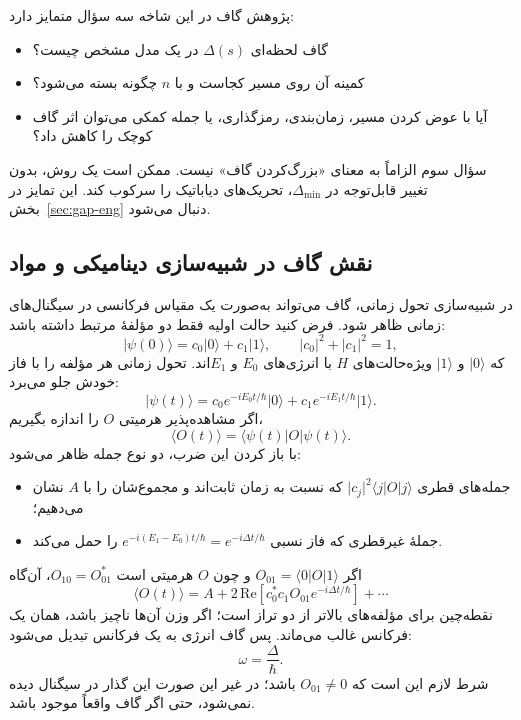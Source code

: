 پژوهش گاف در این شاخه سه سؤال متمایز دارد:
\begin{itemize}
	\item گاف لحظه‌ای $\Delta(s)$ در یک مدل مشخص چیست؟
	\item کمینه آن روی مسیر کجاست و با $n$ چگونه بسته می‌شود؟
	\item آیا با عوض کردن مسیر، زمان‌بندی، رمزگذاری، یا جمله کمکی می‌توان اثر گاف کوچک را کاهش داد؟
\end{itemize}

سؤال سوم الزاماً به معنای «بزرگ‌کردن گاف» نیست.
ممکن است یک روش، بدون تغییر قابل‌توجه در $\Delta_{\min}$، تحریک‌های دیاباتیک را سرکوب کند.
این تمایز در بخش~\ref{sec:gap-eng} دنبال می‌شود.

\subsection{نقش گاف در شبیه‌سازی دینامیکی و مواد}

در شبیه‌سازی تحول زمانی، گاف می‌تواند به‌صورت یک مقیاس فرکانسی در سیگنال‌های زمانی ظاهر شود.
فرض کنید حالت اولیه فقط دو مؤلفهٔ مرتبط داشته باشد:
\begin{equation}
	\lvert\psi(0)\rangle
	=
	c_0\lvert0\rangle+c_1\lvert1\rangle,
	\qquad
	\lvert c_0\rvert^{2}+\lvert c_1\rvert^{2}=1,
\end{equation}
که $\lvert0\rangle$ و $\lvert1\rangle$ ویژه‌حالت‌های $H$ با انرژی‌های $E_0$ و $E_1$اند.
تحول زمانی هر مؤلفه را با فاز خودش جلو می‌برد:
\begin{equation}
	\lvert\psi(t)\rangle
	=
	c_0 e^{-iE_0 t/\hbar}\lvert0\rangle
	+
	c_1 e^{-iE_1 t/\hbar}\lvert1\rangle.
\end{equation}
اگر مشاهده‌پذیر هرمیتی $O$ را اندازه بگیریم،
\begin{equation}
	\langle O(t)\rangle
	=
	\langle\psi(t)\rvert O\lvert\psi(t)\rangle.
\end{equation}
با باز کردن این ضرب، دو نوع جمله ظاهر می‌شود:
\begin{itemize}
	\item جمله‌های قطری $\lvert c_j\rvert^{2}\langle j\rvert O\lvert j\rangle$ که نسبت به زمان ثابت‌اند و مجموع‌شان را با $A$ نشان می‌دهیم؛
	\item جملهٔ غیرقطری که فاز نسبی
	$e^{-i(E_1-E_0)t/\hbar}=e^{-i\Delta t/\hbar}$
	را حمل می‌کند.
\end{itemize}
اگر
$O_{01}=\langle0\rvert O\lvert1\rangle$
و چون $O$ هرمیتی است $O_{10}=O_{01}^{*}$، آن‌گاه
\begin{equation}
	\langle O(t)\rangle
	=
	A
	+
	2\,\mathrm{Re}
	\left[
	c_0^{*}c_1 O_{01}
	e^{-i\Delta t/\hbar}
	\right]
	+\cdots
	\label{eq:gap-osc-dyn}
\end{equation}
نقطه‌چین برای مؤلفه‌های بالاتر از دو تراز است؛ اگر وزن آن‌ها ناچیز باشد، همان یک فرکانس غالب می‌ماند.
پس گاف انرژی به یک فرکانس تبدیل می‌شود:
\begin{equation}
	\omega=\frac{\Delta}{\hbar}.
\end{equation}
شرط لازم این است که $O_{01}\ne0$ باشد؛ در غیر این صورت این گذار در سیگنال دیده نمی‌شود، حتی اگر گاف واقعاً موجود باشد.

